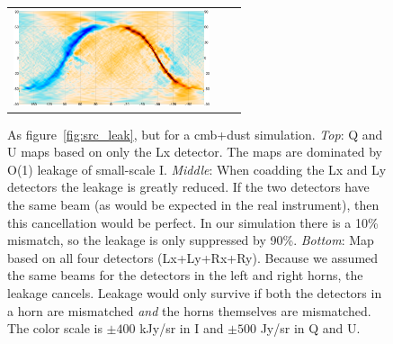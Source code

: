 \documentclass{article}
\begin{document}
\begin{figure}
\begin{tabular}{rm{54.4mm}m{56mm}}
		\includegraphics[height=28mm,clip,trim=7.5mm 8mm 0 0]{plots/ellip_mismatch_sky_sb_tot_map_2.png}
	\end{tabular}
	\caption{As figure~\ref{fig:src_leak}, but for a cmb+dust simulation.
	\emph{Top}: Q and U maps based on only the Lx detector.
	The maps are dominated by O(1) leakage of small-scale I. \emph{Middle}:
	When coadding the Lx and Ly detectors the leakage is greatly reduced. If
	the two detectors have the same beam (as would be expected in the real instrument),
	then this cancellation would be perfect. In our simulation there is a 10\% mismatch,
	so the leakage is only suppressed by 90\%. \emph{Bottom}: Map based on all
	four detectors (Lx+Ly+Rx+Ry). Because we assumed the same beams for the detectors
	in the left and right horns, the leakage cancels. Leakage would only survive if
	both the detectors in a horn are mismatched \emph{and} the horns themselves are
	mismatched. The color scale is $\pm 400$ kJy/sr in I and $\pm 500$ Jy/sr
	in Q and U.}
\end{figure}
\end{document}
